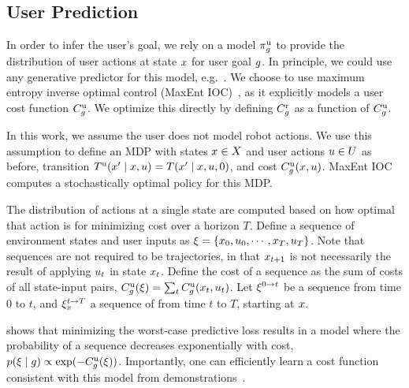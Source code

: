\subsection{User Prediction}
\label{sec:framework_prediction}

In order to infer the user's goal, we rely on a model $\pi^{\text{u}}_g$ to provide the distribution of user actions at state $x$ for user goal $g$. In principle, we could use any generative predictor for this model, e.g.~\citep{koppula_2013, wang_2013_intentioninference}. We choose to use maximum entropy inverse optimal control (MaxEnt IOC)~\citep{ziebart_2008}, as it explicitly models a user cost function $C^{\text{u}}_g$. We optimize this directly by defining $C^{\text{r}}_g$ as a function of $C^{\text{u}}_g$.

In this work, we assume the user does not model robot actions. We use this assumption to define an MDP with states $x \in X$ and user actions $u \in U$ as before, transition $T^{\text{u}}(x' \mid x, u) = T(x' \mid x, u, 0)$, and cost $C^{\text{u}}_g(x, u)$. MaxEnt IOC computes a stochastically optimal policy for this MDP.

The distribution of actions at a single state are computed based on how optimal that action is for minimizing cost over a horizon $T$. Define a sequence of environment states and user inputs as $\xi = \left\{ x_0, u_0, \cdots, x_T, u_T \right\}$. Note that sequences are not required to be trajectories, in that $x_{t+1}$ is not necessarily the result of applying $u_t$ in state $x_t$. Define the cost of a sequence as the sum of costs of all state-input pairs, $C_g^{\text{u}}(\xi) = \sum_{t} C_g^{\text{u}}(x_t, u_t)$. Let $\xi^{0 \rightarrow t}$ be a sequence from time $0$ to $t$, and $\xi_{x}^{t \rightarrow T}$ a sequence of from time $t$ to $T$, starting at $x$.

\citet{ziebart_thesis} shows that minimizing the worst-case predictive loss results in a model where the probability of a sequence decreases exponentially with cost, $p(\xi \mid g) \propto \exp(-C_g^{\text{u}}(\xi))$. Importantly, one can efficiently learn a cost function consistent with this model from demonstrations~\citep{ziebart_2008}.

